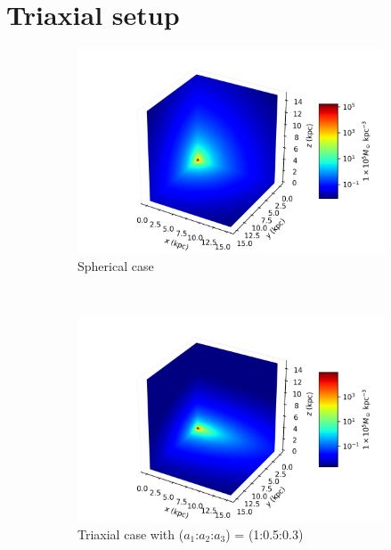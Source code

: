 	\section{Triaxial setup}
		\begin{figure}[h]
			\centering
			\begin{subfigure}[t]{0.49\textwidth}
				\includegraphics[width = \textwidth]{"../Files/Week 7/symmetric"}
				\caption{Spherical case}
				\label{fig: symmetricDensity3d}
			\end{subfigure}
			~ 
			\begin{subfigure}[t]{0.49\textwidth}
				\includegraphics[width=\textwidth]{"../Files/Week 7/triaxial"}
				\caption{Triaxial case with ($a_1$:$a_2$:$a_3$) = (1:0.5:0.3)}
				\label{fig: triaxialDensity3d}
			\end{subfigure}
			\begin{subfigure}[t]{0.6\textwidth}

\end{subfigure}
\end{figure}

